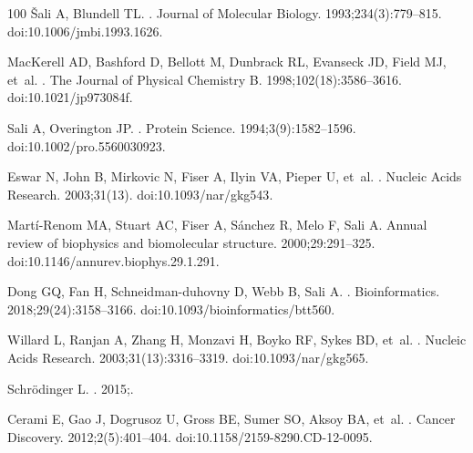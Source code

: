 \documentclass[10pt,letterpaper]{article}
\begin{document}
\begin{thebibliography}{100}
{\v{S}}ali A, Blundell TL.
.
\newblock Journal of Molecular Biology. 1993;234(3):779--815.
\newblock doi:{10.1006/jmbi.1993.1626}.

MacKerell AD, Bashford D, Bellott M, Dunbrack RL, Evanseck JD, Field MJ, et~al.
.
\newblock The Journal of Physical Chemistry B. 1998;102(18):3586--3616.
\newblock doi:{10.1021/jp973084f}.

Sali A, Overington JP.
.
\newblock Protein Science. 1994;3(9):1582--1596.
\newblock doi:{10.1002/pro.5560030923}.

Eswar N, John B, Mirkovic N, Fiser A, Ilyin VA, Pieper U, et~al.
.
\newblock Nucleic Acids Research. 2003;31(13).
\newblock doi:{10.1093/nar/gkg543}.

Mart{\'{i}}-Renom MA, Stuart AC, Fiser A, S{\'{a}}nchez R, Melo F, Sali A.
\newblock Annual review of biophysics and biomolecular structure.
  2000;29:291--325.
\newblock doi:{10.1146/annurev.biophys.29.1.291}.

Dong GQ, Fan H, Schneidman-duhovny D, Webb B, Sali A.
.
\newblock Bioinformatics. 2018;29(24):3158--3166.
\newblock doi:{10.1093/bioinformatics/btt560}.

Willard L, Ranjan A, Zhang H, Monzavi H, Boyko RF, Sykes BD, et~al.
.
\newblock Nucleic Acids Research. 2003;31(13):3316--3319.
\newblock doi:{10.1093/nar/gkg565}.

Schr{\"{o}}dinger L.
. 2015;.

Cerami E, Gao J, Dogrusoz U, Gross BE, Sumer SO, Aksoy BA, et~al.
.
\newblock Cancer Discovery. 2012;2(5):401--404.
\newblock doi:{10.1158/2159-8290.CD-12-0095}.


\end{thebibliography}
\end{document}
